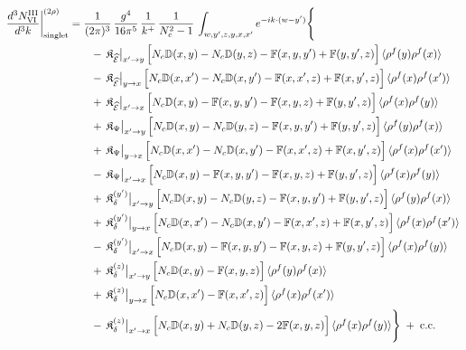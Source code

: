 \documentclass[9pt]{article}
\def\mf#1{\mathbb{#1}}
\numberwithin{equation}{section}
\begin{document}
{\begin{align}
\frac{d^{3}N^{\rm III}_{\rm VI}}{d^{3}k}\bigg|^{(2\rho)}_{\rm singlet}&=\frac{1}{(2\pi)^{3}}\,\frac{g^{4}}{16\pi^{5}}\,\frac{1}{k^{+}}\,\frac{1}{N_{c}^{2}-1}\,\int_{w,y',z,y,x,x'}e^{-ik\cdot(w-y')}\Bigg\{\notag\\
&\qquad -\,\mathfrak{K}_{\widehat{\mathcal{E}}}\big|_{x'\to y}\,\Big[N_{c}\mf{D}(x,y)-N_{c}\mf{D}(y,z)-\mf{F}(x,y,y')+\mf{F}(y,y',z)\Big]\,\langle\rho^{f}(y)\rho^{f}(x)\rangle\notag\\
&\qquad -\,\mathfrak{K}_{\widehat{\mathcal{E}}}\big|_{y\to x}\,\Big[N_{c}\mf{D}(x,x')-N_{c}\mf{D}(x,y')-\mf{F}(x,x',z)+\mf{F}(x,y',z)\Big]\,\langle\rho^{f}(x)\rho^{f}(x')\rangle\notag\\
&\qquad +\,\mathfrak{K}_{\widehat{\mathcal{E}}}\big|_{x'\to x}\,\Big[N_{c}\mf{D}(x,y)-\mf{F}(x,y,y')-\mf{F}(x,y,z)+\mf{F}(y,y',z)\Big]\,\langle\rho^{f}(x)\rho^{f}(y)\rangle\notag\\
&\qquad +\,\mathfrak{K}_{\Psi}\big|_{x'\to y}\,\Big[N_{c}\mf{D}(x,y)-N_{c}\mf{D}(y,z)-\mf{F}(x,y,y')+\mf{F}(y,y',z)\Big]\,\langle\rho^{f}(y)\rho^{f}(x)\rangle\notag\\
&\qquad +\,\mathfrak{K}_{\Psi}\big|_{y\to x}\,\Big[N_{c}\mf{D}(x,x')-N_{c}\mf{D}(x,y')-\mf{F}(x,x',z)+\mf{F}(x,y',z)\Big]\,\langle\rho^{f}(x)\rho^{f}(x')\rangle\notag\\
&\qquad -\,\mathfrak{K}_{\Psi}\big|_{x'\to x}\,\Big[N_{c}\mf{D}(x,y)-\mf{F}(x,y,y')-\mf{F}(x,y,z)+\mf{F}(y,y',z)\Big]\,\langle\rho^{f}(x)\rho^{f}(y)\rangle\notag\\
&\qquad +\,\mathfrak{K}_{\delta}^{(y')}\big|_{x'\to y}\,\Big[N_{c}\mf{D}(x,y)-N_{c}\mf{D}(y,z)-\mf{F}(x,y,y')+\mf{F}(y,y',z)\Big]\,\langle\rho^{f}(y)\rho^{f}(x)\rangle\notag\\
&\qquad +\,\mathfrak{K}_{\delta}^{(y')}\big|_{y\to x}\,\Big[N_{c}\mf{D}(x,x')-N_{c}\mf{D}(x,y')-\mf{F}(x,x',z)+\mf{F}(x,y',z)\Big]\,\langle\rho^{f}(x)\rho^{f}(x')\rangle\notag\\
&\qquad -\,\mathfrak{K}_{\delta}^{(y')}\big|_{x'\to x}\,\Big[N_{c}\mf{D}(x,y)-\mf{F}(x,y,y')-\mf{F}(x,y,z)+\mf{F}(y,y',z)\Big]\,\langle\rho^{f}(x)\rho^{f}(y)\rangle\notag\\
&\qquad +\,\mathfrak{K}_{\delta}^{(z)}\big|_{x'\to y}\,\Big[N_{c}\mf{D}(x,y)-\mf{F}(x,y,z)\Big]\,\langle\rho^{f}(y)\rho^{f}(x)\rangle\notag\\
&\qquad +\,\mathfrak{K}_{\delta}^{(z)}\big|_{y\to x}\,\Big[N_{c}\mf{D}(x,x')-\mf{F}(x,x',z)\Big]\,\langle\rho^{f}(x)\rho^{f}(x')\rangle\notag\\
&\qquad -\,\mathfrak{K}_{\delta}^{(z)}\big|_{x'\to x}\,\Big[N_{c}\mf{D}(x,y)+N_{c}\mf{D}(y,z)-2\mf{F}(x,y,z)\Big]\,\langle\rho^{f}(x)\rho^{f}(y)\rangle\Bigg\}\;+\;{\rm c.c.}\label{eq:s-III-VI}
\end{align}

}
\end{document}
